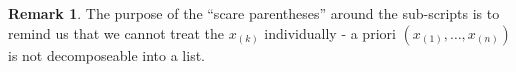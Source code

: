 \documentclass[pra,floatfix,
amsmath,superscriptaddress, 12pt]{article}
\theoremstyle{definition}
\newtheorem*{remark}{Remark}
\newcommand{\cG}{\mathcal{G}}
\begin{document}
\begin{remark}
	The purpose of the ``scare parentheses'' around the sub-scripts is to remind us that we cannot treat the $x_{(k)}$ individually - a priori $(x_{(1)},\dots,x_{(n)})$ is not decomposeable into a list.
\end{remark}










\end{document}
